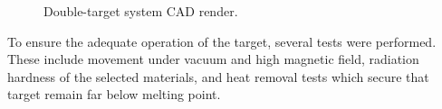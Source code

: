     \begin{figure}[b!]
        \centering{}
        \caption[Double-target system.]{Double-target system CAD render.}
        \label{fig::double_target}
    \end{figure}

    To ensure the adequate operation of the target, several tests were performed.
    These include movement under vacuum and high magnetic field, radiation hardness of the selected materials, and heat removal tests which secure that target remain far below melting point.
    
    
